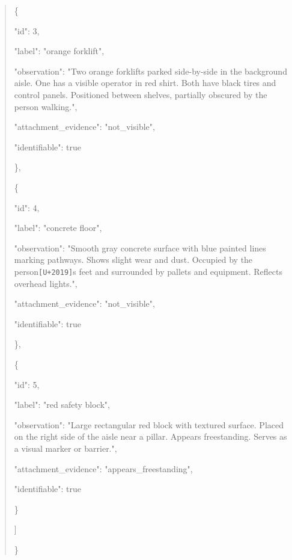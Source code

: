\documentclass[10pt,a4paper]{article}
\begin{document}
\begin{quote}
    \{\par
      "id":\allowbreak{} 3,\allowbreak{}\par
      "label":\allowbreak{} "orange forklift",\allowbreak{}\par
      "observation":\allowbreak{} "Two orange forklifts parked side-by-side in the background aisle. One has a visible operator in red shirt. Both have black tires and control panels. Positioned between shelves,\allowbreak{} partially obscured by the person walking.",\allowbreak{}\par
      "attachment\_evidence":\allowbreak{} "not\_visible",\allowbreak{}\par
      "identifiable":\allowbreak{} true\par
    \},\allowbreak{}\par
    \{\par
      "id":\allowbreak{} 4,\allowbreak{}\par
      "label":\allowbreak{} "concrete floor",\allowbreak{}\par
      "observation":\allowbreak{} "Smooth gray concrete surface with blue painted lines marking pathways. Shows slight wear and dust. Occupied by the person\texttt{[U+2019]}s feet and surrounded by pallets and equipment. Reflects overhead lights.",\allowbreak{}\par
      "attachment\_evidence":\allowbreak{} "not\_visible",\allowbreak{}\par
      "identifiable":\allowbreak{} true\par
    \},\allowbreak{}\par
    \{\par
      "id":\allowbreak{} 5,\allowbreak{}\par
      "label":\allowbreak{} "red safety block",\allowbreak{}\par
      "observation":\allowbreak{} "Large rectangular red block with textured surface. Placed on the right side of the aisle near a pillar. Appears freestanding. Serves as a visual marker or barrier.",\allowbreak{}\par
      "attachment\_evidence":\allowbreak{} "appears\_freestanding",\allowbreak{}\par
      "identifiable":\allowbreak{} true\par
    \}\par
  ]\par
\}
\end{quote}
\end{document}
